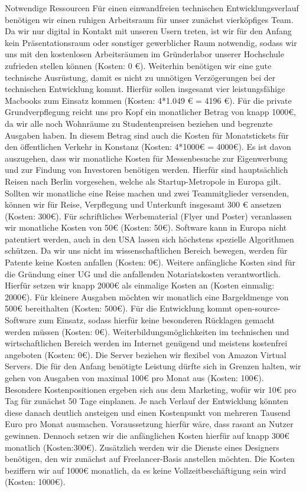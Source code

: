 Notwendige Ressourcen
Für einen einwandfreien technischen Entwicklungsverlauf benötigen wir einen ruhigen Arbeitsraum für unser zunächst vierköpfiges Team. Da wir nur digital in Kontakt mit unseren Usern treten, ist wir für den Anfang kein Präsentationsraum oder sonstiger gewerblicher Raum notwendig, sodass wir uns mit den kostenlosen Arbeitsräumen im Gründerlabor unserer Hochschule zufrieden stellen können (Kosten: 0 €). 
Weiterhin benötigen wir eine gute technische Ausrüstung, damit es nicht zu unnötigen Verzögerungen bei der technischen Entwicklung kommt. Hierfür sollen insgesamt vier leistungsfähige Macbooks zum Einsatz kommen (Kosten: 4*1.049 € = 4196 €).
Für die private Grundverpflegung reicht uns pro Kopf ein monatlicher Betrag von knapp 1000€, da wir alle noch Wohnräume zu Studentenpreisen beziehen und begrenzte Ausgaben haben. In diesem Betrag sind auch die Kosten für Monatstickets für den öffentlichen Verkehr in Konstanz (Kosten: 4*1000€ = 4000€).
Es ist davon auszugehen, dass wir monatliche Kosten für Messenbesuche zur Eigenwerbung und zur Findung von Investoren benötigen werden. Hierfür sind hauptsächlich Reisen nach Berlin vorgesehen, welche als Startup-Metropole in Europa gilt. Sollten wir monatliche eine Reise machen und zwei Teammitglieder versenden, können wir für Reise, Verpflegung und Unterkunft insgesamt 300 € ansetzen (Kosten: 300€).
Für schriftliches Werbematerial (Flyer und Poster) veranlassen wir monatliche Kosten von 50€ (Kosten: 50€).
Software kann in Europa nicht patentiert werden, auch in den USA lassen sich höchstens spezielle Algorithmen schützen. Da wir uns nicht im wissenschaftlichen Bereich bewegen, werden für Patente keine Kosten anfallen (Kosten: 0€).
Weitere anfängliche Kosten sind für die Gründung einer UG und die anfallenden Notariatskosten verantwortlich. Hierfür setzen wir knapp 2000€ als einmalige Kosten an (Kosten einmalig: 2000€).
Für kleinere Ausgaben möchten wir monatlich eine Bargeldmenge von 500€ bereithalten (Kosten: 500€).
Für die Entwicklung kommt open-source-Software zum Einsatz, sodass hierfür keine besonderen Rücklagen gemacht werden müssen (Kosten: 0€).
Weiterbildungsmöglichkeiten im technischen und wirtschaftlichen Bereich werden im Internet genügend und meistens kostenfrei angeboten  (Kosten: 0€).
Die Server beziehen wir flexibel von Amazon Virtual Servers. Die für den Anfang benötigte Leistung dürfte sich in Grenzen halten, wir gehen von Ausgaben von maximal 100€ pro Monat aus  (Kosten: 100€).
Besondere Kostenpositionen ergeben sich aus dem Marketing, wofür wir 10€ pro Tag für zunächst 50 Tage einplanen. Je nach Verlauf der Entwicklung könnten diese danach deutlich ansteigen und einen Kostenpunkt von mehreren Tausend Euro pro Monat ausmachen. Voraussetzung hierfür wäre, dass rasant an Nutzer gewinnen. Dennoch setzen wir die anfänglichen Kosten hierfür auf knapp 300€ monatlich  (Kosten:300€).
Zusätzlich werden wir die Dienste eines Designers benötigen, den wir zunächst auf Freelancer-Basis anstellen möchten. Die Kosten beziffern wir auf 1000€ monatlich, da es keine Vollzeitbeschäftigung sein wird  (Kosten: 1000€).

